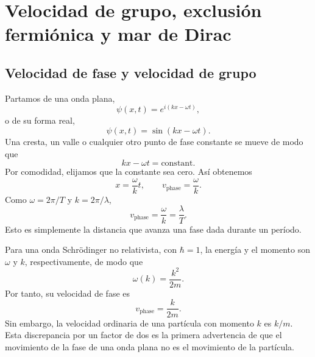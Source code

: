 \chapter{Velocidad de grupo, exclusión fermiónica y mar de Dirac}

\section{Velocidad de fase y velocidad de grupo}

\begin{classroomqa}\end{classroomqa}

Partamos de una onda plana,
\begin{equation}
\psi(x,t)=e^{i(kx-\omega t)},
\end{equation}
o de su forma real,
\begin{equation}
\psi(x,t)=\sin(kx-\omega t).
\end{equation}
Una cresta, un valle o cualquier otro punto de fase constante se mueve de modo que
\begin{equation}
kx-\omega t=\text{constant}.
\end{equation}
Por comodidad, elijamos que la constante sea cero. Así obtenemos
\begin{equation}
x=\frac{\omega}{k}t,
\qquad
v_{\mathrm{phase}}=\frac{\omega}{k}.
\end{equation}
Como \(\omega=2\pi/T\) y \(k=2\pi/\lambda\),
\begin{equation}
v_{\mathrm{phase}}=\frac{\omega}{k}=\frac{\lambda}{T}.
\end{equation}
Esto es simplemente la distancia que avanza una fase dada durante un período.

Para una onda Schr\"odinger no relativista, con \(\hbar=1\), la energía y el momento son \(\omega\) y \(k\), respectivamente, de modo que
\begin{equation}
\omega(k)=\frac{k^2}{2m}.
\end{equation}
Por tanto, su velocidad de fase es
\begin{equation}
v_{\mathrm{phase}}=\frac{k}{2m}.
\end{equation}
Sin embargo, la velocidad ordinaria de una partícula con momento \(k\) es \(k/m\). Esta discrepancia por un factor de dos es la primera advertencia de que el movimiento de la fase de una onda plana no es el movimiento de la partícula.

